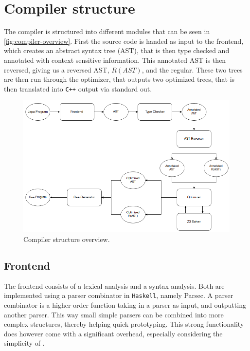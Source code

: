 \section{Compiler structure}
The \lan compiler is structured into different modules that can be seen in
\autoref{fig:compiler-overview}. First the \lan source code is handed as input to the frontend,
which creates an abstract syntax tree (AST), that is then type checked and annotated with
context sensitive information. This annotated AST is then reversed, giving us a reversed AST,
$R(AST)$, and the regular. These two trees are then run through the optimizer, that outputs
two optimized trees, that is then translated into \texttt{C++} output via standard out.

\begin{figure}[h!]
    \centering
    \includegraphics[scale=0.55]{imgs/compiler-overview.png}
    \caption{Compiler structure overview.}
    \label{fig:compiler-overview}
\end{figure}

\subsection{Frontend}
The frontend consists of a lexical analysis and a syntax analysis. Both are implemented using a
parser combinator in \texttt{Haskell}, namely Parsec. A parser combinator is a higher-order
function taking in a parser as input, and outputting another parser. This way small simple parsers
can be combined into more complex structures, thereby helping quick prototyping. This strong
functionality does however come with a significant overhead, especially considering the simplicity
of \lan \cite{parser}.

